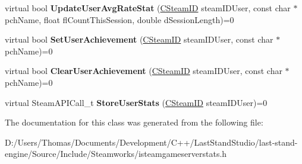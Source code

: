 \begin{DoxyCompactItemize}
\item 
\hypertarget{classISteamGameServerStats_abdbe8f8783865658704edabcf49605c3}{}virtual bool {\bfseries Update\+User\+Avg\+Rate\+Stat} (\hyperlink{classCSteamID}{C\+Steam\+I\+D} steam\+I\+D\+User, const char $\ast$pch\+Name, float fl\+Count\+This\+Session, double d\+Session\+Length)=0\label{classISteamGameServerStats_abdbe8f8783865658704edabcf49605c3}

\item 
\hypertarget{classISteamGameServerStats_a85767d40b80228574e72fb6986a717ad}{}virtual bool {\bfseries Set\+User\+Achievement} (\hyperlink{classCSteamID}{C\+Steam\+I\+D} steam\+I\+D\+User, const char $\ast$pch\+Name)=0\label{classISteamGameServerStats_a85767d40b80228574e72fb6986a717ad}

\item 
\hypertarget{classISteamGameServerStats_ad6164382a507d9d48ddeb3ff28c11af0}{}virtual bool {\bfseries Clear\+User\+Achievement} (\hyperlink{classCSteamID}{C\+Steam\+I\+D} steam\+I\+D\+User, const char $\ast$pch\+Name)=0\label{classISteamGameServerStats_ad6164382a507d9d48ddeb3ff28c11af0}

\item 
\hypertarget{classISteamGameServerStats_a9a2df5cf35138faf5c32cef561df93df}{}virtual Steam\+A\+P\+I\+Call\+\_\+t {\bfseries Store\+User\+Stats} (\hyperlink{classCSteamID}{C\+Steam\+I\+D} steam\+I\+D\+User)=0\label{classISteamGameServerStats_a9a2df5cf35138faf5c32cef561df93df}

\end{DoxyCompactItemize}


The documentation for this class was generated from the following file\+:\begin{DoxyCompactItemize}
\item 
D\+:/\+Users/\+Thomas/\+Documents/\+Development/\+C++/\+Last\+Stand\+Studio/last-\/stand-\/engine/\+Source/\+Include/\+Steamworks/isteamgameserverstats.\+h\end{DoxyCompactItemize}
